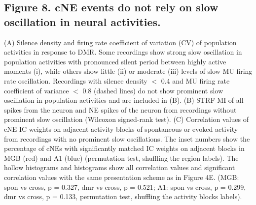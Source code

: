 \documentclass[11pt]{article}
\begin{document}
\subsection*{Figure 8. cNE events do not rely on slow oscillation in neural activities.}
(A) Silence density and firing rate coefficient of variation (CV) of population activities in response to DMR. Some recordings show strong slow oscillation in population activities with pronounced silent period between highly active moments (i), while others show little (ii) or moderate (iii) levels of slow MU firing rate oscillation. Recordings with silence density $<$ 0.4 and MU firing rate coefficient of variance $<$ 0.8 (dashed lines) do not show prominent slow oscillation in population activities and are included in (B). 
(B) STRF MI of all spikes from the neuron and NE spikes of the neuron from recordings without prominent slow oscillation (Wilcoxon signed-rank test). 
(C) Correlation values of cNE IC weights on adjacent activity blocks of spontaneous or evoked activity from recordings with no prominent slow oscillations. The inset numbers show the percentage of cNEs with significantly matched IC weights on adjacent blocks in MGB (red) and A1 (blue) (permutation test, shuffling the region labels). The hollow histograms and histograms show all correlation values and significant correlation values with the same presentation scheme as in Figure 4E. (MGB: spon vs cross, p = 0.327, dmr vs cross, p = 0.521; A1: spon vs cross, p = 0.299, dmr vs cross, p = 0.133, permutation test, shuffling the activity blocks labels).



\end{document}
